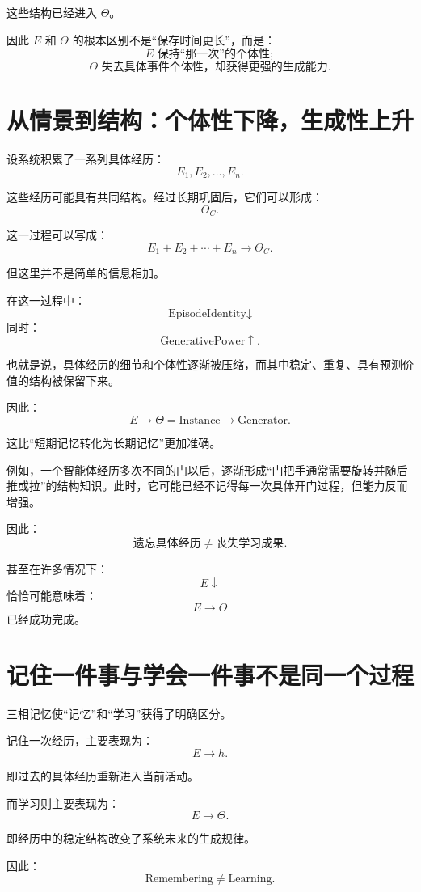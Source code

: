 这些结构已经进入 $\Theta$。

因此 $E$ 和 $\Theta$ 的根本区别不是“保存时间更长”，而是：
\[
\boxed{
E
\text{ 保持“那一次”的个体性};
}
\]
\[
\boxed{
\Theta
\text{ 失去具体事件个体性，却获得更强的生成能力}.
}
\]

\section{从情景到结构：个体性下降，生成性上升}

设系统积累了一系列具体经历：
\[
E_1,E_2,\ldots,E_n.
\]

这些经历可能具有共同结构。经过长期巩固后，它们可以形成：
\[
\Theta_C.
\]

这一过程可以写成：
\[
\boxed{
E_1+E_2+\cdots+E_n
\rightarrow
\Theta_C.
}
\]

但这里并不是简单的信息相加。

在这一过程中：
\[
\boxed{
\text{EpisodeIdentity}\downarrow
}
\]
同时：
\[
\boxed{
\text{GenerativePower}\uparrow.
}
\]

也就是说，具体经历的细节和个体性逐渐被压缩，而其中稳定、重复、具有预测价值的结构被保留下来。

因此：
\[
\boxed{
E\rightarrow\Theta
=
\text{Instance}\rightarrow\text{Generator}.
}
\]

这比“短期记忆转化为长期记忆”更加准确。

例如，一个智能体经历多次不同的门以后，逐渐形成“门把手通常需要旋转并随后推或拉”的结构知识。此时，它可能已经不记得每一次具体开门过程，但能力反而增强。

因此：
\[
\boxed{
\text{遗忘具体经历}
\neq
\text{丧失学习成果}.
}
\]

甚至在许多情况下：
\[
\boxed{
E\downarrow
}
\]
恰恰可能意味着：
\[
\boxed{
E\rightarrow\Theta
}
\]
已经成功完成。

\section{记住一件事与学会一件事不是同一个过程}

三相记忆使“记忆”和“学习”获得了明确区分。

记住一次经历，主要表现为：
\[
\boxed{
E\rightarrow h.
}
\]

即过去的具体经历重新进入当前活动。

而学习则主要表现为：
\[
\boxed{
E\rightarrow\Theta.
}
\]

即经历中的稳定结构改变了系统未来的生成规律。

因此：
\[
\boxed{
\text{Remembering}\neq\text{Learning}.
}
\]

